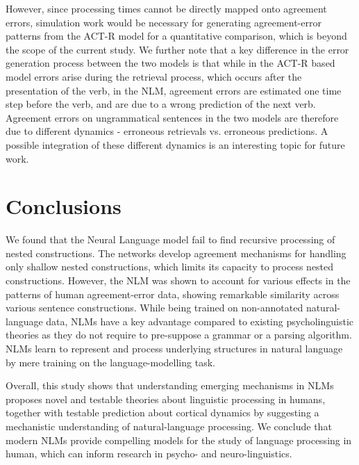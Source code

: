 However, since processing times cannot be directly mapped onto agreement errors, simulation work would be necessary for generating agreement-error patterns from the ACT-R model for a quantitative comparison, which is beyond the scope of the current study. We further note that a key difference in the error generation process between the two models is that while in the ACT-R based model errors arise during the retrieval process, which occurs after the presentation of the verb, in the NLM, agreement errors are estimated one time step before the verb, and are due to a wrong prediction of the next verb. Agreement errors on ungrammatical sentences in the two models are therefore due to different dynamics - erroneous retrievals vs. erroneous predictions. A possible integration of these different dynamics is an interesting topic for future work.


\section{Conclusions}
We found that the Neural Language model fail to find recursive processing of nested constructions. The networks develop agreement mechanisms for handling only shallow nested constructions, which limits its capacity to process nested constructions. However, the NLM was shown to account for various effects in the patterns of human agreement-error data, showing remarkable similarity across various sentence constructions. While being trained on non-annotated natural-language data, NLMs have a key advantage compared to existing psycholinguistic theories as they do not require to pre-suppose a grammar or a parsing algorithm. NLMs learn to represent and process underlying structures in natural language by mere training on the language-modelling task. 

Overall, this study shows that understanding emerging mechanisms in NLMs proposes novel and testable theories about linguistic processing in humans, together with testable prediction about cortical dynamics by suggesting a mechanistic understanding of natural-language processing. We conclude that modern NLMs provide compelling models for the study of language processing in human, which can inform research in psycho- and neuro-linguistics. 